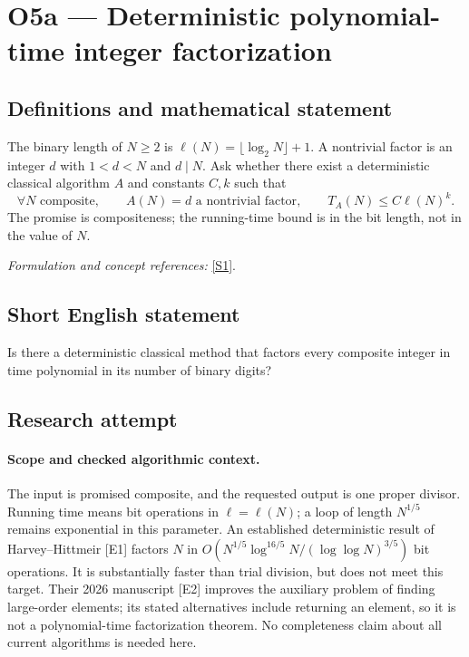 \documentclass[11pt]{article}
\begin{document}
\section*{\texorpdfstring{O5a — Deterministic polynomial-time integer factorization}{O5a — Deterministic polynomial-time integer factorization}}\label{statement}
\subsection{Definitions and mathematical statement}
The binary length of $N\ge2$ is $\ell(N)=\lfloor\log_2N\rfloor+1$. A nontrivial factor is an integer $d$ with $1<d<N$ and $d\mid N$. Ask whether there exist a deterministic classical algorithm $A$ and constants $C,k$ such that
\[
 \forall N\text{ composite},\qquad A(N)=d\text{ a nontrivial factor},\qquad
 T_A(N)\le C\ell(N)^k.
\]
The promise is compositeness; the running-time bound is in the bit length, not in the value of $N$.
\par\smallskip\textit{Formulation and concept references:} \href{https://www.sciencedirect.com/science/article/pii/S0022000015000768}{[S1]}.

\subsection{Short English statement}
Is there a deterministic classical method that factors every composite integer in time polynomial in its number of binary digits?
\subsection{Research attempt}

\paragraph{Scope and checked algorithmic context.}
The input is promised composite, and the requested output is one proper
divisor. Running time means bit operations in $\ell=\ell(N)$; a loop of
length $N^{1/5}$ remains exponential in this parameter. An established
deterministic result of Harvey--Hittmeir [E1] factors $N$ in
$O(N^{1/5}\log^{16/5}N/(\log\log N)^{3/5})$ bit operations. It is
substantially faster than trial division, but does not meet this target.
Their 2026 manuscript [E2] improves the auxiliary problem of finding
large-order elements; its stated alternatives include returning an element,
so it is not a polynomial-time factorization theorem. No completeness
claim about all current algorithms is needed here.
\end{document}
